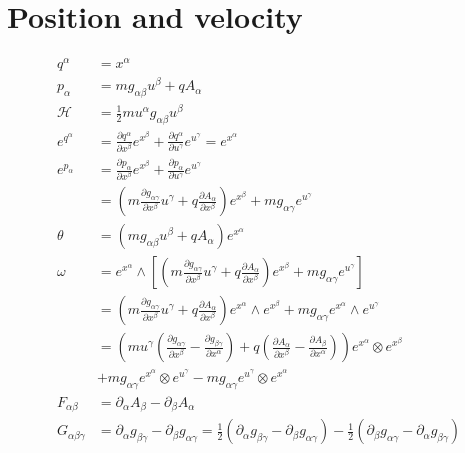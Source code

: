 \documentclass[11pt]{article}
\begin{document}
\section{Position and velocity}

\begin{equation}
\begin{aligned}
q^\alpha &= x^\alpha \\
p_\alpha &= m g_{\alpha \beta} u^\beta + q A_\alpha \\
\mathcal{H} &= \frac{1}{2} m u^\alpha g_{\alpha\beta} u^\beta \\
e^{q^\alpha} &= \frac{\partial q^\alpha}{\partial x^\beta}e^{x^\beta} + \frac{\partial q^\alpha}{\partial u^\gamma}e^{u^\gamma} = e^{x^\alpha} \\
e^{p_\alpha} &= \frac{\partial p_\alpha}{\partial x^\beta}e^{x^\beta} + \frac{\partial p_\alpha}{\partial u^\gamma}e^{u^\gamma} \\
&= \left(m \frac{\partial g_{\alpha\gamma}}{\partial x^\beta} u^\gamma + q \frac{\partial A_\alpha}{\partial x^\beta} \right)e^{x^\beta} + m g_{\alpha \gamma} e^{u^\gamma} \\
\theta &= (m g_{\alpha \beta} u^\beta + q A_\alpha) e^{x^\alpha} \\
\omega &= e^{x^\alpha} \wedge \left[ \left(m \frac{\partial g_{\alpha\gamma}}{\partial x^\beta} u^\gamma + q \frac{\partial A_\alpha}{\partial x^\beta} \right)e^{x^\beta} + m g_{\alpha \gamma} e^{u^\gamma} \right] \\
&= \left(m \frac{\partial g_{\alpha\gamma}}{\partial x^\beta} u^\gamma + q \frac{\partial A_\alpha}{\partial x^\beta} \right) e^{x^\alpha} \wedge e^{x^\beta} + m g_{\alpha \gamma} e^{x^\alpha} \wedge e^{u^\gamma} \\
&= \left(m u^\gamma \left( \frac{\partial g_{\alpha\gamma}}{\partial x^\beta} -  \frac{\partial g_{\beta\gamma}}{\partial x^\alpha}\right) + q \left( \frac{\partial A_\alpha}{\partial x^\beta} - \frac{\partial A_\beta}{\partial x^\alpha}\right) \right) e^{x^\alpha} \otimes e^{x^\beta} \\
&+ m g_{\alpha \gamma} e^{x^\alpha} \otimes e^{u^\gamma} - m g_{\alpha \gamma} e^{u^\gamma} \otimes e^{x^\alpha} \\
F_{\alpha\beta} &= \partial_\alpha A_\beta - \partial_\beta A_\alpha \\
G_{\alpha\beta\gamma} &= \partial_\alpha g_{\beta \gamma} - \partial_\beta g_{\alpha \gamma} = \frac{1}{2} (\partial_\alpha g_{\beta \gamma} - \partial_\beta g_{\alpha \gamma}) - \frac{1}{2} (\partial_\beta g_{\alpha \gamma} - \partial_\alpha g_{\beta \gamma}) \\

\end{aligned}
\end{equation}
\end{document}
